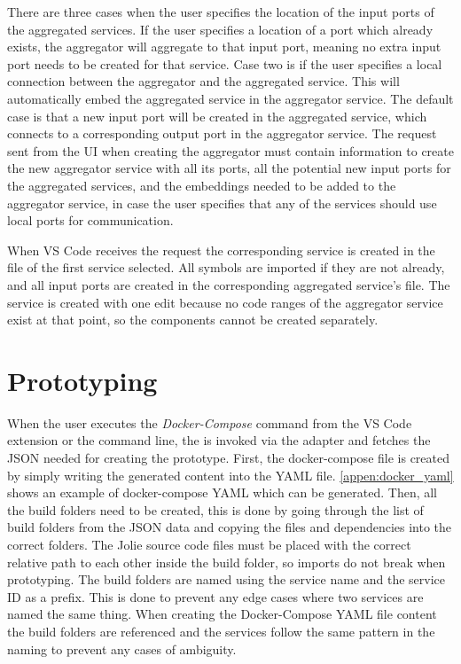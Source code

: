 There are three cases when the user specifies the location of the input ports of the aggregated services.
If the user specifies a location of a port which already exists, the aggregator will aggregate to that input port, meaning no extra input port needs to be created for that service.
Case two is if the user specifies a local connection between the aggregator and the aggregated service. This will automatically embed the aggregated service in the aggregator service.
The default case is that a new input port will be created in the aggregated service, which connects to a corresponding output port in the aggregator service. 
The request sent from the UI when creating the aggregator must contain information to create the new aggregator service with all its ports, all the potential new input ports for the aggregated services, and the embeddings needed to be added to the aggregator service, in case the user specifies that any of the services should use local ports for communication.

When VS Code receives the request the corresponding service is created in the file of the first service selected.
All symbols are imported if they are not already, and all input ports are created in the corresponding aggregated service's file.
The service is created with one edit because no code ranges of the aggregator service exist at that point, so the components cannot be created separately.

\section{Prototyping}
When the user executes the \emph{Docker-Compose} command from the VS Code extension or the command line, the
\javatoolname[] is invoked via the adapter and fetches the JSON needed for creating the prototype.
First, the docker-compose file is created by simply writing the generated content into the YAML file.
\cref{appen:docker_yaml} shows an example of docker-compose YAML which can be generated.
Then, all the build folders need to be created, this is done by going through the list of build folders from the JSON data and copying the files and dependencies into the correct folders.
The Jolie source code files must be placed with the correct relative path to each other inside the build folder, so imports do not break when prototyping.
The build folders are named using the service name and the service ID as a prefix. This is done to prevent any edge cases where two services are named the same thing.
When creating the Docker-Compose YAML file content the build folders are referenced and the services follow the same pattern in the naming to prevent any cases of ambiguity.

